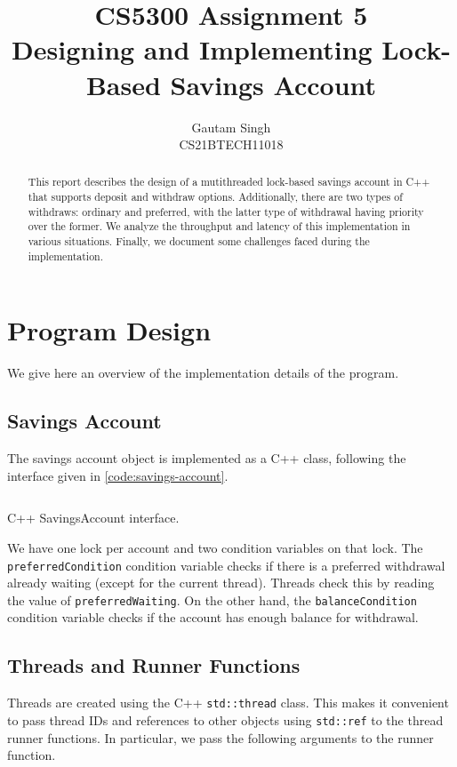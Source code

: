\documentclass[conference,compsoc]{IEEEtran}
\begin{document}
\title{CS5300 Assignment 5\\Designing and Implementing Lock-Based Savings Account}
\author{Gautam Singh\\CS21BTECH11018}
\maketitle
\tableofcontents

\bigskip

\begin{abstract}
    This report describes the design of a mutithreaded lock-based savings
    account in C++ that supports deposit and withdraw options. Additionally,
    there are two types of withdraws: ordinary and preferred, with the latter
    type of withdrawal having priority over the former. We analyze the
    throughput and latency of this implementation in various situations.
    Finally, we document some challenges faced during the implementation.
\end{abstract}

\section{Program Design}
\label{sec:prog-design}

We give here an overview of the implementation details of the program.

\subsection{Savings Account}
\label{subsec:snap-interface}

The savings account object is implemented as a C++ class, following the
interface given in \autoref{code:savings-account}.

\begin{listing}[!ht]
\inputminted{cpp}{codes/SavingsAccount.cpp}
\caption{C++ SavingsAccount interface.}
\label{code:savings-account}
\end{listing}

We have one lock per account and two condition variables on that lock. The
\texttt{preferredCondition} condition variable checks if there is a preferred
withdrawal already waiting (except for the current thread). Threads check this
by reading the value of \texttt{preferredWaiting}. On the other hand, the
\texttt{balanceCondition} condition variable checks if the account has enough
balance for withdrawal.

\subsection{Threads and Runner Functions}
\label{subsec:threads-and-runners}
Threads are created using the C++ \texttt{std::thread} class. This makes it
convenient to pass thread IDs and references to other objects using
\texttt{std::ref} to the thread runner functions. In particular, we pass the
following arguments to the runner function.
\end{document}
